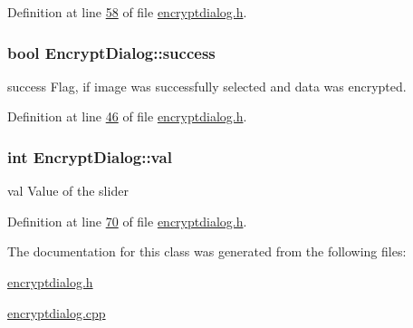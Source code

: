 Definition at line \hyperlink{encryptdialog_8h_source_l00058}{58} of file \hyperlink{encryptdialog_8h_source}{encryptdialog.\-h}.

\hypertarget{class_encrypt_dialog_ada4900bcd40894d9c098c65aa4066ac9}{
\subsubsection[{success}]{\setlength{\rightskip}{0pt plus 5cm}bool Encrypt\-Dialog\-::success}}\label{class_encrypt_dialog_ada4900bcd40894d9c098c65aa4066ac9}


success Flag, if image was successfully selected and data was encrypted. 



Definition at line \hyperlink{encryptdialog_8h_source_l00046}{46} of file \hyperlink{encryptdialog_8h_source}{encryptdialog.\-h}.

\hypertarget{class_encrypt_dialog_a3c9da51b5e9d98d702bcc4ed15405fd5}{
\subsubsection[{val}]{\setlength{\rightskip}{0pt plus 5cm}int Encrypt\-Dialog\-::val}}\label{class_encrypt_dialog_a3c9da51b5e9d98d702bcc4ed15405fd5}


val Value of the slider 



Definition at line \hyperlink{encryptdialog_8h_source_l00070}{70} of file \hyperlink{encryptdialog_8h_source}{encryptdialog.\-h}.



The documentation for this class was generated from the following files\-:\begin{DoxyCompactItemize}
\item 
\hyperlink{encryptdialog_8h}{encryptdialog.\-h}\item 
\hyperlink{encryptdialog_8cpp}{encryptdialog.\-cpp}\end{DoxyCompactItemize}
